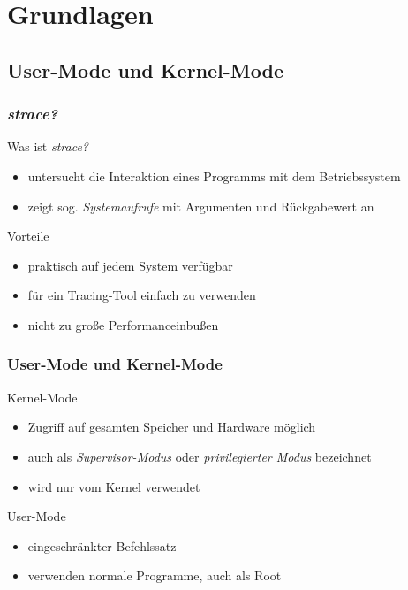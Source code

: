 \section{Grundlagen}

\subsection{User-Mode und Kernel-Mode}

\begin{frame}
  \frametitle{\emph{strace?}}

  \begin{block}{Was ist \emph{strace?}}
    \begin{itemize}
      \item untersucht die Interaktion eines Programms mit dem Betriebssystem
      \item zeigt sog. \emph{Systemaufrufe} mit Argumenten und Rückgabewert an
    \end{itemize}
  \end{block}

  \begin{block}{Vorteile}
    \begin{itemize}
      \item praktisch auf jedem System verfügbar
      \item für ein Tracing-Tool einfach zu verwenden
      \item nicht zu große Performanceinbußen
    \end{itemize}
  \end{block}

\end{frame}

\begin{frame}
  \frametitle{User-Mode und Kernel-Mode}

  \begin{block}{Kernel-Mode}
    \begin{itemize}
      \item Zugriff auf gesamten Speicher und Hardware möglich
      \item auch als \emph{Supervisor-Modus} oder \emph{privilegierter Modus} bezeichnet
      \item wird nur vom Kernel verwendet
    \end{itemize}
  \end{block}

  \begin{block}{User-Mode}
    \begin{itemize}
      \item eingeschränkter Befehlssatz
      \item verwenden normale Programme, auch als Root
    \end{itemize}
  \end{block}
\end{frame}

